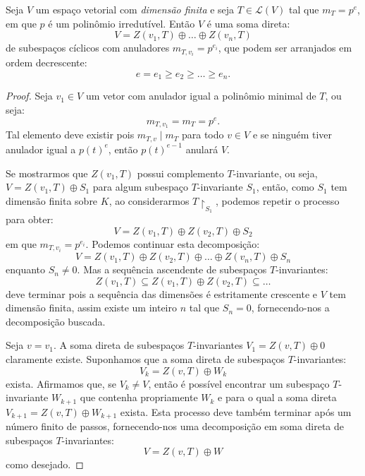 \documentclass[11pt,twoside,a4paper]{book}
\begin{document}
\begin{teorema}
Seja $V$ um espaço vetorial com \emph{dimensão finita} e seja $T\in\mathcal{L}(V)$ tal que $m_T=p^e$, em que $p$ é um polinômio irredutível. Então $V$ é uma soma direta:
\[
V=Z(v_1,T)\oplus\dots\oplus Z(v_n,T)
\]
de subespaços cíclicos com anuladores $m_{T,v_i}=p^{e_i}$, que podem ser arranjados em ordem decrescente:
\[
e=e_1\geq e_2\geq\dots\geq e_n.
\]
\end{teorema}
\begin{proof}
Seja $v_1\in V$ um vetor com anulador igual a polinômio minimal de $T$, ou seja:
\[
m_{T,v_1}=m_T=p^e.
\]
Tal elemento deve existir pois $m_{T,v}\mid m_T$ para todo $v\in V$ e se ninguém tiver anulador igual a $p(t)^e$, então $p(t)^{e-1}$ anulará $V$.

\medskip
\noindent
Se mostrarmos que $Z(v_1,T)$ possui complemento $T$-invariante, ou seja, $V=Z(v_1,T)\oplus S_1$ para algum subespaço $T$-invariante $S_1$, então, como $S_1$ tem dimensão finita sobre $K$, ao considerarmos $T\upharpoonright_{S_1}$, podemos repetir o processo para obter:
\[
V=Z(v_1,T)\oplus Z(v_2,T)\oplus S_2
\]
em que $m_{T,v_i}=p^{e_i}$. Podemos continuar esta decomposição:
\[
V=Z(v_1,T)\oplus Z(v_2,T)\oplus\dots\oplus Z(v_n,T)\oplus S_n
\]
enquanto $S_n\neq 0$. Mas a sequência ascendente de subespaços $T$-invariantes:
\[
Z(v_1,T)\subseteq Z(v_1,T)\oplus Z(v_2,T)\subseteq\dots
\]
deve terminar pois a sequência das dimensões é estritamente crescente e $V$ tem dimensão finita, assim existe um inteiro $n$ tal que $S_n=0$, fornecendo-nos a decomposição buscada.

\medskip
\noindent
Seja $v=v_1$. A soma direta de subespaços $T$-invariantes $V_1=Z(v,T)\oplus 0$ claramente existe. Suponhamos que a soma direta de subespaços $T$-invariantes:
\[
V_k=Z(v,T)\oplus W_k
\]
exista. Afirmamos que, se $V_k\neq V$, então é possível encontrar um subespaço $T$-invariante $W_{k+1}$ que contenha propriamente $W_k$ e para o qual a soma direta $V_{k+1}=Z(v,T)\oplus W_{k+1}$ exista. Esta processo deve também terminar após um número finito de passos, fornecendo-nos uma decomposição em soma direta de subespaços $T$-invariantes:
\[
V=Z(v,T)\oplus W
\]
como desejado.


\end{proof}
\end{document}
